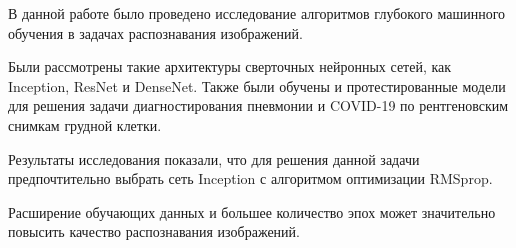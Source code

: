 В данной работе было проведено исследование алгоритмов глубокого машинного обучения в задачах распознавания изображений. 

Были рассмотрены такие архитектуры сверточных нейронных сетей, как Inception, ResNet и DenseNet. Также были обучены и протестированные модели для решения задачи диагностирования пневмонии и COVID-19 по рентгеновским снимкам грудной клетки. 

Результаты исследования показали, что для решения данной задачи предпочтительно выбрать сеть Inception с алгоритмом оптимизации RMSprop.
 
Расширение обучающих данных и большее количество эпох может значительно повысить качество распознавания изображений.

\clearpage
